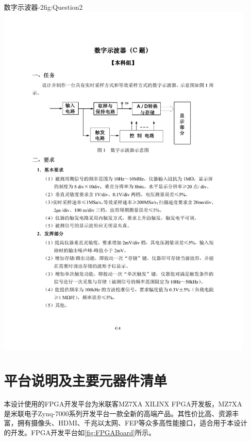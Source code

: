 \documentclass[supercite]{HustGraduPaper}
\begin{document}
\begin{appendices}
		\begin{generalfig}[htb]{数字示波器-2}{fig:Question2}
			\includegraphics[width=13cm,page=2]{Docs/Question.pdf}
		\end{generalfig}
	
		\section{平台说明及主要元器件清单}
		本设计使用的FPGA开发平台为米联客MZ7XA XILINX FPGA开发板，MZ7XA是米联电子Zynq-7000系列开发平台一款全新的高端产品。其性价比高、资源丰富，拥有摄像头、HDMI、千兆以太网、FEP等众多高性能接口，适合用于本设计的开发。FPGA开发平台如\autoref{fig:FPGABoard}所示。
		

\end{appendices}
\end{document}
